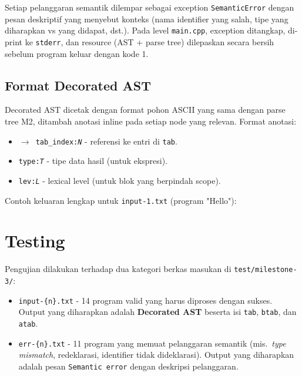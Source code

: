 \documentclass[11pt,a4paper]{article}
\begin{document}
Setiap pelanggaran semantik dilempar sebagai exception \texttt{SemanticError}
dengan pesan deskriptif yang menyebut konteks (nama identifier yang salah,
tipe yang diharapkan vs yang didapat, dst.). Pada level \texttt{main.cpp},
exception ditangkap, di-print ke \texttt{stderr}, dan resource (AST + parse
tree) dilepaskan secara bersih sebelum program keluar dengan kode 1.

\subsection{Format Decorated AST}

Decorated AST dicetak dengan format pohon ASCII yang sama dengan parse tree
M2, ditambah anotasi inline pada setiap node yang relevan. Format anotasi:

\begin{itemize}
    \item \texttt{$\to$ tab\_index:\textit{N}} - referensi ke entri di
          \texttt{tab}.
    \item \texttt{type:\textit{T}} - tipe data hasil (untuk ekspresi).
    \item \texttt{lev:\textit{L}} - lexical level (untuk blok yang berpindah
          scope).
\end{itemize}

Contoh keluaran lengkap untuk \texttt{input-1.txt} (program "Hello"):



\section{Testing}

Pengujian dilakukan terhadap dua kategori berkas masukan di
\texttt{test/milestone-3/}:

\begin{itemize}
    \item \texttt{input-\{n\}.txt} - 14 program valid yang harus diproses
          dengan sukses. Output yang diharapkan adalah \textbf{Decorated AST}
          beserta isi \texttt{tab}, \texttt{btab}, dan \texttt{atab}.
    \item \texttt{err-\{n\}.txt} - 11 program yang memuat pelanggaran
          semantik (mis.\ \textit{type mismatch}, redeklarasi, identifier
          tidak dideklarasi). Output yang diharapkan adalah pesan
          \texttt{Semantic error} dengan deskripsi pelanggaran.
\end{itemize}
\end{document}
